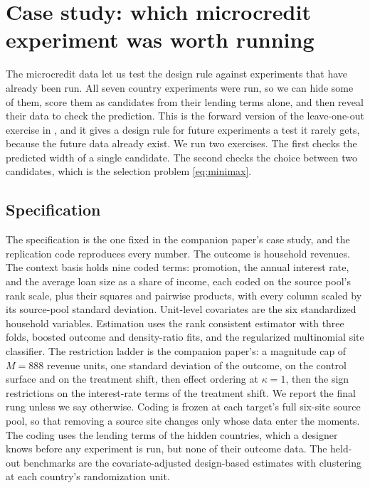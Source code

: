 \section{Case study: which microcredit experiment was worth running}
\label{sec:case-study}

The microcredit data let us test the design rule against experiments
that have already been run. All seven country experiments were run, so we can
hide some of them, score them as candidates from their lending terms
alone, and then reveal their data to check the prediction. This is the
forward version of the leave-one-out exercise in \citet{boyarsky2026},
and it gives a design rule for future experiments a test it rarely
gets, because the future data already exist. We run two exercises. The
first checks the predicted width of a single candidate. The second
checks the choice between two candidates, which is the selection
problem \eqref{eq:minimax}.

\subsection{Specification}
\label{subsec:case-spec}

The specification is the one fixed in the companion paper's case study,
and the replication code reproduces every number. The outcome is household revenues. The context basis holds nine
coded terms: promotion, the annual interest rate, and the average loan
size as a share of income, each coded on the source pool's rank scale,
plus their squares and pairwise products, with every column scaled by
its source-pool standard deviation. Unit-level covariates are the six
standardized household variables. Estimation uses the rank consistent
estimator with three folds, boosted outcome and density-ratio fits, and
the regularized multinomial site classifier. The restriction ladder is
the companion paper's: a magnitude cap of $M=888$ revenue units, one
standard deviation of the outcome, on the control surface and on the
treatment shift, then effect ordering at $\kappa=1$, then the sign
restrictions on the interest-rate terms of the treatment shift. We
report the final rung unless we say otherwise. Coding is frozen at each
target's full six-site source pool, so that removing a source site
changes only whose data enter the moments. The coding uses the lending
terms of the hidden countries, which a designer knows before any
experiment is run, but none of their outcome data. The held-out
benchmarks are the covariate-adjusted design-based estimates with
clustering at each country's randomization unit.

